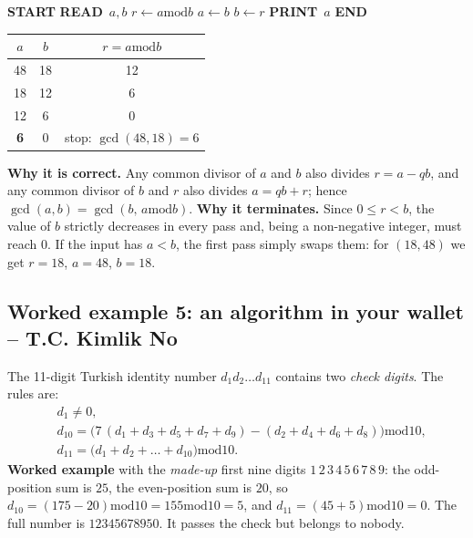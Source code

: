 \documentclass[11pt,a4paper]{article}
\newcommand{\READ}{\textbf{READ}\ }
\newcommand{\PRINT}{\textbf{PRINT}\ }
\newcommand{\START}{\State \textbf{START}}
\newcommand{\STOP}{\State \textbf{END}}
\newcommand{\MOD}{\mathbin{\mathrm{mod}}}
\begin{document}
\begin{pseudobox}
\begin{algorithmic}[1]
\START
\State \READ $a, b$ 
  \State $r \gets a \MOD b$
  \State $a \gets b$
  \State $b \gets r$
\EndWhileX
\State \PRINT $a$
\STOP
\end{algorithmic}
\end{pseudobox}

\begin{center}\small
\begin{tabular}{ccc}
\toprule
$a$ & $b$ & $r = a \MOD b$\\ \midrule
48 & 18 & 12\\
18 & 12 & 6\\
12 & 6 & 0\\
\textcolor{repc}{\textbf{6}} & \textcolor{repc}{0} & stop: $\gcd(48,18)=6$\\ \bottomrule
\end{tabular}
\end{center}
\textbf{Why it is correct.} Any common divisor of $a$ and $b$ also divides $r=a-qb$, and any common divisor of $b$ and $r$ also divides $a=qb+r$; hence $\gcd(a,b)=\gcd(b,\,a \MOD b)$. \textbf{Why it terminates.} Since $0 \le r < b$, the value of $b$ strictly decreases in every pass and, being a non-negative integer, must reach $0$. If the input has $a<b$, the first pass simply swaps them: for $(18,48)$ we get $r=18$, $a=48$, $b=18$.

\subsection{Worked example 5: an algorithm in your wallet -- T.C. Kimlik No}
The 11-digit Turkish identity number $d_1d_2\dots d_{11}$ contains two \emph{check digits}. The rules are:
\begin{align}
& d_1 \neq 0, \\
& d_{10} = \Big( 7\,(d_1+d_3+d_5+d_7+d_9) - (d_2+d_4+d_6+d_8) \Big) \MOD 10, \\
& d_{11} = \Big( d_1 + d_2 + \dots + d_{10} \Big) \MOD 10 .
\end{align}
\textbf{Worked example} with the \emph{made-up} first nine digits $1\,2\,3\,4\,5\,6\,7\,8\,9$: the odd-position sum is $25$, the even-position sum is $20$, so $d_{10} = (175-20) \MOD 10 = 155 \MOD 10 = 5$, and $d_{11}=(45+5)\MOD 10 = 0$. The full number is $12345678950$. It passes the check but belongs to nobody.
\end{document}
